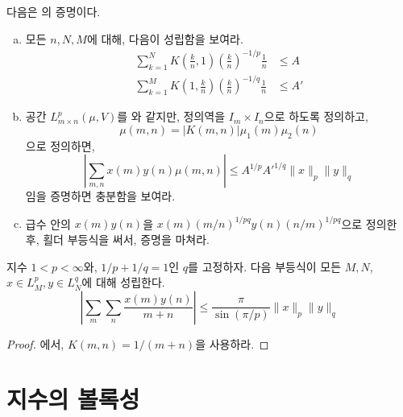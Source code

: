 \begin{exercise}
    다음은 의 증명이다.
    \begin{enumerate}[(a)]
        \item 모든 $n, N, M$에 대해, 다음이 성립함을 보여라.
        \begin{align*}
            \sum_{k = 1}^N K\left(\frac{k}{n}, 1\right) \left(\frac{k}{n}\right)^{-1/p} \frac{1}{n} &\leq A \\
            \sum_{k = 1}^M K\left(1, \frac{k}{n}\right) \left(\frac{k}{n}\right)^{-1/q} \frac{1}{n} &\leq A'
        \end{align*}
        \item 공간 $L^p_{m \times n}(\mu, V)$를 와 같지만, 정의역을 $I_m \times I_n$으로 하도록 정의하고, 
        \begin{equation*}
            \mu(m, n) = |K(m, n)| \mu_1(m)\mu_2(n)
        \end{equation*}
        으로 정의하면,
        \begin{equation*}
            \left| \sum_{m, n} x(m)y(n) \mu(m, n) \right| \leq A^{1/p} A'^{1/q} \|x\|_p \|y\|_q
        \end{equation*}
        임을 증명하면 충분함을 보여라.
        \item 급수 안의 $x(m)y(n)$을 $x(m)(m/n)^{1/pq} y(n)(n/m)^{1/pq}$으로 정의한 후, 횔더 부등식을 써서, 증명을 마쳐라.
    \end{enumerate}
\end{exercise}

\begin{theorem}
\label{thm:hilbertineq}  
    지수 $1 < p < \infty$와, $1/p + 1/q = 1$인 $q$를 고정하자.
    다음 부등식이 모든 $M, N$, $x \in L_M^p, y \in L_N^q$에 대해 성립한다.
    \begin{equation*}
        \left| \sum_m \sum_n \frac{x(m)y(n)}{m + n} \right| \leq \frac{\pi}{\sin(\pi/p)} \|x\|_p \|y\|_q
    \end{equation*}
\end{theorem}
\begin{proof}
    에서, $K(m, n) = 1/(m + n)$을 사용하라.
\end{proof}

\section{지수의 볼록성}

